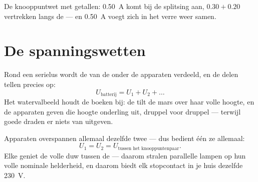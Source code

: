 \begin{omfigure}

{\small De knooppuntwet met getallen: \qty{0.50}{A} komt bij de
splitsing aan, $0.30 + 0.20$ vertrekken langs de  --- en
\qty{0.50}{A} voegt zich in het verre  weer samen.}
\end{omfigure}

\section{De spanningswetten}

\begin{proposition}\label{prop:g8:circuit-laws:seriesU}
Rond een serielus wordt de  van de
 onder de apparaten verdeeld, en de delen tellen precies
op:
\[
U_{\text{batterij}} = U_1 + U_2 + \dots
\]
Het watervalbeeld houdt de boeken bij: de
 tilt de mars over haar volle hoogte, en de apparaten
geven die hoogte onderling uit, druppel voor druppel --- terwijl goede
draden er niets van uitgeven.
\end{proposition}

\begin{proposition}\label{prop:g8:circuit-laws:parallelU}
Apparaten  overspannen allemaal dezelfde twee
 --- dus bedient één  ze allemaal:
\[
U_1 = U_2 = U_{\text{tussen het knooppuntenpaar}} .
\]
Elke  geniet de volle duw tussen de
 --- daarom stralen parallelle lampen op hun volle
nominale helderheid, en daarom biedt elk stopcontact in je huis dezelfde
\qty{230}{V}.
\end{proposition}

